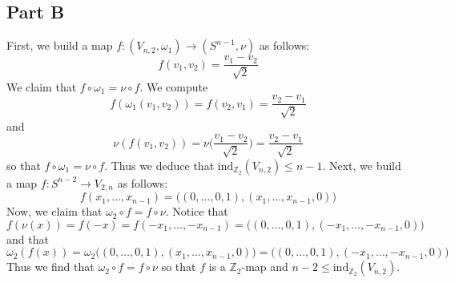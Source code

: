 \documentclass[12pt]{article}
\newcommand{\zz}{\mathbb Z}
\begin{document}
\subsection*{Part B}
First, we build a map $f: (V_{n,2}, \omega_1) \rightarrow (S^{n-1}, \nu)$ as follows:
\[
f(v_1,v_2) = \frac{v_1 - v_2}{\sqrt{2}}
\] We claim that $f \circ \omega_1 = \nu \circ f$. We compute
\[
f(\omega_1(v_1,v_2)) = f(v_2,v_1) = \frac{v_2 - v_1}{\sqrt{2}}
\] and
\[
\nu(f(v_1,v_2)) = \nu\bigg(\frac{v_1-v_2}{\sqrt{2}}\bigg) = \frac{v_2 - v_1}{\sqrt{2}}
\] so that $f \circ \omega_1 = \nu \circ f$. Thus we deduce that $\text{ind}_{\zz_2} (V_{n,2}) \leq n-1$. Next, we build a map $f: S^{n-2} \rightarrow V_{2,n}$ as follows:
\[
f(x_1,\ldots,x_{n-1}) = \big((0,\ldots,0,1), (x_1,\ldots,x_{n-1},0)\big)
\] Now, we claim that $\omega_2 \circ f = f \circ \nu$. Notice that
\[
f(\nu(x)) = f(-x) = f(-x_1,\ldots,-x_{n-1}) = \big((0,\ldots,0,1),(-x_1,\ldots,-x_{n-1},0)\big)
\] and that
\[
\omega_2(f(x)) = \omega_2\big((0,\ldots,0,1), (x_1,\ldots,x_{n-1},0)\big) = \big((0,\ldots,0,1),(-x_1,\ldots,-x_{n-1},0)\big)
\] Thus we find that $\omega_2 \circ f = f \circ \nu$ so that $f$ is a $\zz_2$-map and $n-2 \leq \text{ind}_{\zz_2}(V_{n,2})$.
\end{document}
